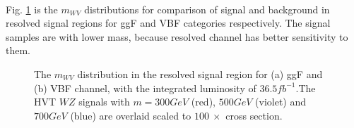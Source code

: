 \\Fig. \ref{Fig:ResolvedSR} is the $m_{WV}$ distributions for comparison of signal and background in resolved signal regions for ggF and VBF categories respectively. The signal samples are with lower mass, because resolved channel has better sensitivity to them. 
\begin{figure}[h]
	\centering
	\caption{The $m_{WV}$ distribution in the resolved signal region for (a) ggF and (b) VBF channel, with the integrated luminosity of $36.5fb^{-1}$.The HVT $WZ$ signals with $m=300GeV$ (red), $500GeV$ (violet) and $700GeV$ (blue) are overlaid 
		scaled to $100 ~\times$ cross section.}
	\label{Fig:ResolvedSR}
\end{figure}
